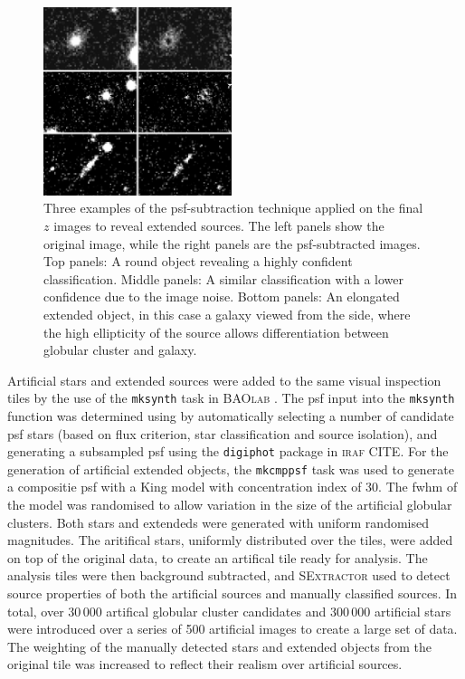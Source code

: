 \documentclass[useAMS,usenatbib]{mn2e}
\begin{document}
\begin{figure}
	\includegraphics[width=0.49\textwidth]{images/Subtracted.jpg}
	\caption{Three examples of the psf-subtraction technique applied on the
		final $z$ images to reveal extended sources. The left panels show
		the original image, while the right panels are the psf-subtracted
		images. Top panels: A round object revealing a highly confident classification. Middle panels: A similar classification with a lower confidence due to the image noise. Bottom panels: An elongated extended object, in this case a galaxy viewed from the side, where the high ellipticity of the source allows differentiation between globular cluster and galaxy.}
	\label{fig:subtraction}
\end{figure}



Artificial stars and extended sources were added to the same visual inspection tiles by the use of the \verb|mksynth| task in \textsc{BAOlab} \citep{Larsen1999}. The psf input into the \verb|mksynth| function was determined using by automatically selecting a number of candidate psf stars (based on flux criterion, star classification and source isolation), and generating a subsampled psf using the \verb|digiphot| package in \textsc{iraf} {\color{red} CITE}. For the generation of artificial extended objects, the \verb|mkcmppsf| task was  used to generate a compositie psf with a King model \citep{King1962} with concentration index of 30. The fwhm of the model was randomised to allow variation in the size of the artificial globular clusters. Both stars and extendeds were generated with uniform randomised magnitudes. The aritifical stars, uniformly distributed over the tiles, were added on top of the original data, to create an artifical tile ready for analysis. The analysis tiles were then background subtracted, and \textsc{SExtractor} used to detect source properties of both the artificial sources and manually classified sources. In total, over $30\,000$ artifical globular cluster candidates and $300\,000$ artificial stars were introduced over a series of 500 artificial images to create a large set of data. The weighting of the manually detected stars and extended objects from the original tile was increased to reflect their realism over artificial sources.
\end{document}
